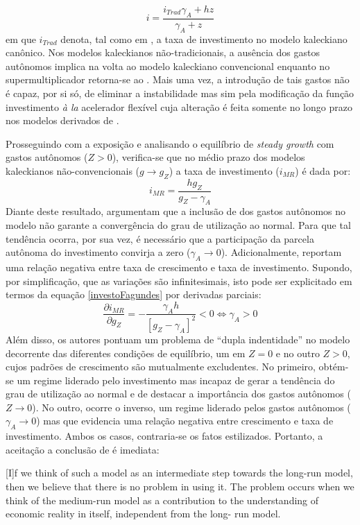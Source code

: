 $$
i = \frac{i_{Trad}\gamma_A + hz}{\gamma_A + z}
$$
em que $i_{Trad}$ denota, tal como em \textcite{fagundes_role_2017}, a taxa de investimento no modelo kaleckiano canônico. Nos modelos kaleckianos não-tradicionais, a ausência dos gastos autônomos implica na volta ao modelo kaleckiano convencional enquanto no supermultiplicador retorna-se ao \textcite{harrod_essay_1939}. Mais uma vez, a introdução de tais gastos não é capaz, por si só, de eliminar a instabilidade  mas sim pela modificação da função investimento \textit{à la} acelerador flexível cuja alteração é feita somente no longo prazo nos modelos derivados de \textcite{allain_tackling_2015}. 

Prosseguindo com a exposição e analisando o equilíbrio de \textit{steady growth} com gastos autônomos ($Z > 0$), verifica-se que no médio prazo dos modelos kaleckianos não-convencionais ($g\to g_Z$) a taxa de investimento ($i_{MR}$) é dada por:
\begin{equation}
\label{investoFagundes}
i_{MR} = \frac{hg_Z}{g_Z - \gamma_A}
\end{equation}
Diante deste resultado, \textcite{fagundes_role_2017} argumentam que a inclusão de dos gastos autônomos no modelo não garante a convergência do grau de utilização ao normal. Para que tal tendência ocorra, por sua vez, é necessário que a participação da parcela autônoma do investimento convirja a zero ($\gamma_A \to 0$). 
Adicionalmente, \textcite{fagundes_role_2017} reportam uma relação negativa entre taxa de crescimento e taxa de investimento. Supondo, por simplificação, que as variações são infinitesimais, isto pode ser explicitado em termos da equação \ref{investoFagundes} por derivadas parciais:
$$
\frac{\partial i_{MR}}{\partial g_Z} = - \frac{\gamma_A h}{[g_Z - \gamma_A]^2} < 0 \Leftrightarrow \gamma_A > 0
$$
Além disso, os autores pontuam um problema de ``dupla indentidade'' no modelo decorrente das diferentes condições de equilíbrio, um em $Z = 0$ e no outro $Z>0$, cujos padrões de crescimento são mutualmente excludentes. No primeiro, obtém-se um regime liderado pelo investimento mas incapaz de gerar a tendência do grau de utilização ao normal e de destacar a importância dos gastos autônomos ($Z\to 0$). No outro, ocorre o inverso, um regime liderado pelos gastos autônomos ($\gamma_A \to 0$) mas que evidencia uma relação negativa entre crescimento e taxa de investimento. Ambos os casos, contraria-se os fatos estilizados. Portanto, a aceitação a conclusão de \textcite[p.~13]{fagundes_role_2017} é imediata:

\begin{citacao}
	
	[I]f we think of such a model as an intermediate step towards the long-run model, then we
	believe that there is no problem in using it. The problem occurs when we think of the medium-run
	model as a contribution to the understanding of economic reality in itself, independent from the long-
	run model.
\end{citacao}

